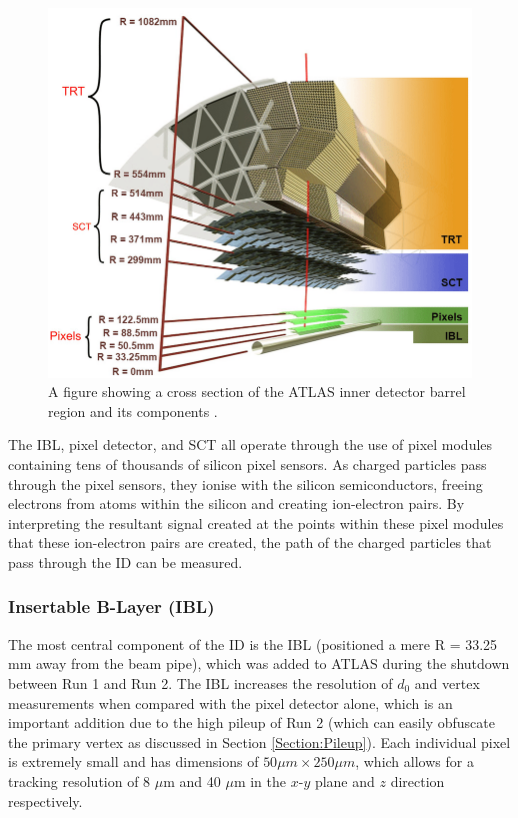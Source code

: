 \documentclass[12pt,a4paper,epsf,portrait,times,epsfig]{report}
\begin{document}
		\begin{figure}
			\centering
			\includegraphics[scale=0.4]{ATLAS_ID_Layers}
			\caption{A figure showing a cross section of the ATLAS inner detector barrel region and its components \cite{ATLASIDImage}.}
			\label{Fig:InnerDetectorXsec}
		\end{figure}

		The IBL, pixel detector, and SCT all operate through the use of pixel modules containing tens of thousands of silicon pixel sensors. As charged particles pass through the pixel sensors, they ionise with the silicon semiconductors, freeing electrons from atoms within the silicon and creating ion-electron pairs. By interpreting the resultant signal created at the points within these pixel modules that these ion-electron pairs are created, the path of the charged particles that pass through the ID can be measured. 

		\subsubsection{Insertable B-Layer (IBL)}\label{Section:IBL}

		The most central component of the ID is the IBL \cite{IBL-TDR} (positioned a mere R = 33.25 mm away from the beam pipe), which was added to ATLAS during the shutdown between Run 1 and Run 2. The IBL increases the resolution of $d_{0}$ and vertex measurements when compared with the pixel detector alone, which is an important addition due to the high pileup of Run 2 (which can easily obfuscate the primary vertex as discussed in Section \ref{Section:Pileup}). Each individual pixel is extremely small and has dimensions of $50 \mu m \times 250 \mu m$, which allows for a tracking resolution of 8 $\mu$m and 40 $\mu$m in the $x$-$y$ plane and $z$ direction respectively.  
\end{document}
